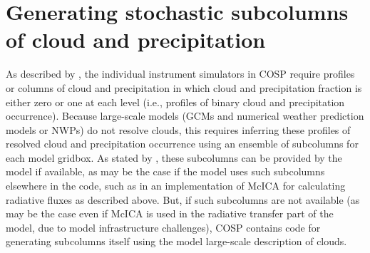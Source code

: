 
\section{Generating stochastic subcolumns of cloud and precipitation}
\label{section_subgrid_scops}
As described by \cite{bodas-salcedo_et_al_2011}, the individual instrument simulators in COSP require profiles or columns of cloud and precipitation in which cloud and precipitation fraction is either zero or one at each level (i.e., profiles of binary cloud and precipitation occurrence). Because large-scale models (GCMs and numerical weather prediction models or NWPs) do not resolve clouds, this requires inferring these profiles of resolved cloud and precipitation occurrence using an ensemble of subcolumns for each model gridbox. As stated by \cite{bodas-salcedo_et_al_2011}, these subcolumns can be provided by the model if available, as may be the case if the model uses such subcolumns elsewhere in the code, such as in an implementation of McICA for calculating radiative fluxes as described above. But, if such subcolumns are not available (as may be the case even if McICA is used in the radiative transfer part of the model, due to model infrastructure challenges), COSP contains code for generating subcolumns itself using the model large-scale description of clouds. 

